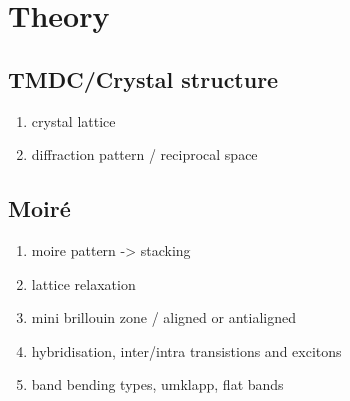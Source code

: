 \section{Theory}
\subsection{TMDC/Crystal structure}
\begin{enumerate}
    \item crystal lattice
    \item diffraction pattern / reciprocal space
\end{enumerate}
\subsection{Moiré}
\begin{enumerate}
    \item moire pattern -> stacking
    \item lattice relaxation
    \item mini brillouin zone / aligned or antialigned
    \item hybridisation, inter/intra transistions and excitons
    \item band bending types, umklapp,  flat bands
\end{enumerate}


